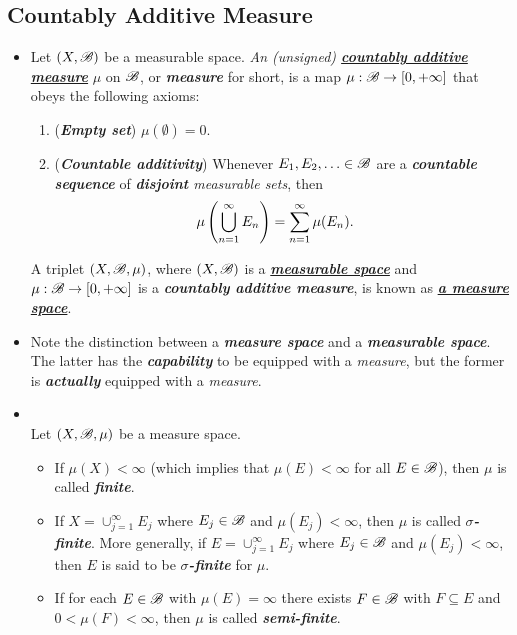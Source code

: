 \documentclass[11pt]{article}
\begin{document}
\subsection{Countably Additive Measure}
\begin{itemize}
\item \begin{definition} 
Let $(X, {\mathscr B})$ be a measurable space. \emph{An (unsigned) \underline{\textbf{countably additive measure}}} $\mu$ on ${\mathscr B}$, or \emph{\textbf{measure}} for short, is a map $\mu: {\mathscr B} \rightarrow [0, +\infty]$ that obeys the following axioms:
\begin{enumerate}
\item (\emph{\textbf{Empty set}}) $\mu(\emptyset) = 0$.
\item (\emph{\textbf{Countable additivity}}) Whenever $E_1, E_2, \ldots \in {\mathscr B}$ are a \emph{\textbf{countable sequence}} of \emph{\textbf{disjoint} measurable sets}, then 
\begin{align*}
\mu\left(\bigcup_{n=1}^{\infty} E_n\right) &= \sum_{n=1}^{\infty} \mu(E_n).
\end{align*}
\end{enumerate}
A triplet $(X, {\mathscr B}, \mu)$, where $(X, {\mathscr B})$ is a \underline{\emph{\textbf{measurable space}}} and $\mu: {\mathscr B} \rightarrow [0, +\infty]$ is a \emph{\textbf{countably additive measure}}, is known as \underline{\emph{\textbf{a measure space}}}.
\end{definition}

\item \begin{remark}
Note the distinction between a \emph{\textbf{measure space}} and a \emph{\textbf{measurable space}}. The latter has the \emph{\textbf{capability}} to be equipped with a \emph{measure}, but the former is \emph{\textbf{actually}} equipped with a \emph{measure}.
\end{remark}

\item \begin{definition} \citep{folland2013real}\\
Let $(X, {\mathscr B}, \mu)$ be a measure space. 
\begin{itemize}
\item If $\mu(X)< \infty$ (which implies that $\mu(E) < \infty$ for all $E \in {\mathscr B}$), then $\mu$ is called \emph{\textbf{finite}}. 
\item If $X = \cup_{j=1}^{\infty}E_j$ where $E_j \in {\mathscr B}$ and $\mu(E_j) < \infty$, then $\mu$ is called \emph{\textbf{$\sigma$-finite}}. More generally, if $E = \cup_{j=1}^{\infty}E_j$ where $E_j \in {\mathscr B}$ and $\mu(E_j) < \infty$, then $E$ is said to be \emph{\textbf{$\sigma$-finite}} for $\mu$.
\item If for each $E \in {\mathscr B}$ with $\mu(E) = \infty$ there exists $F\in {\mathscr B}$ with $F \subseteq E$ and $0 < \mu(F) < \infty$, then $\mu$ is called \emph{\textbf{semi-finite}}.
\end{itemize}
\end{definition}


\end{itemize}
\end{document}
